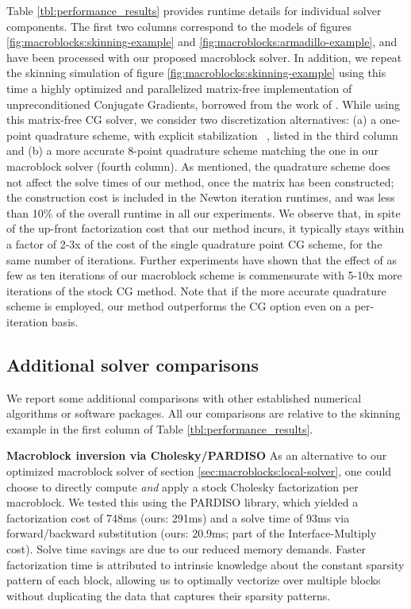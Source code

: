 Table \ref{tbl:performance_results} provides runtime details for
individual solver components. The first two columns correspond to the
models of figures \ref{fig:macroblocks:skinning-example} and
\ref{fig:macroblocks:armadillo-example}, and have been processed with our proposed
macroblock solver. In addition, we repeat the skinning simulation of
figure \ref{fig:macroblocks:skinning-example} using this time a highly optimized
and parallelized matrix-free implementation of unpreconditioned
Conjugate Gradients, borrowed from the work of \citet{MitchCS:2015}. While using this matrix-free CG solver, we
consider two discretization alternatives: (a) a one-point quadrature
scheme, with explicit stabilization
~\citep{McAdaZSETTS:2011,PatteMS:2012}, listed in the third column and
(b) a more accurate 8-point quadrature scheme matching the one in our
macroblock solver (fourth column). As mentioned, the quadrature scheme
does not affect the solve times of our method, once the matrix has
been constructed; the construction cost is included in the Newton
iteration runtimes, and was less than 10\% of the overall runtime in
all our experiments. We observe that, in spite of the up-front
factorization cost that our method incurs, it typically stays within a
factor of 2-3x of the cost of the single quadrature point CG scheme,
for the same number of iterations. Further experiments have shown that
the effect of as few as ten iterations of our macroblock scheme is
commensurate with 5-10x more iterations of the stock CG method. Note
that if the more accurate quadrature scheme is employed, our method
outperforms the CG option even on a per-iteration basis.

\subsection{Additional solver comparisons} 

We report some additional comparisons with other established numerical
algorithms or software packages. All our comparisons are relative to
the skinning example in the first column of Table
\ref{tbl:performance_results}.

\noindent\textbf{Macroblock inversion via Cholesky/PARDISO} As an
alternative to our optimized macroblock solver of section
\ref{sec:macroblocks:local-solver}, one could choose to directly compute
\emph{and} apply a stock Cholesky factorization per macroblock. We
tested this using the PARDISO library, which yielded a factorization
cost of 748ms (ours: 291ms) and a solve time of 93ms via
forward/backward substitution (ours: 20.9ms; part of the
\textsf{Interface-Multiply} cost). Solve time savings are due to our
reduced memory demands. Faster factorization time is attributed to
intrinsic knowledge about the constant sparsity pattern of each block,
allowing us to optimally vectorize over multiple blocks without
duplicating the data that captures their sparsity patterns.

